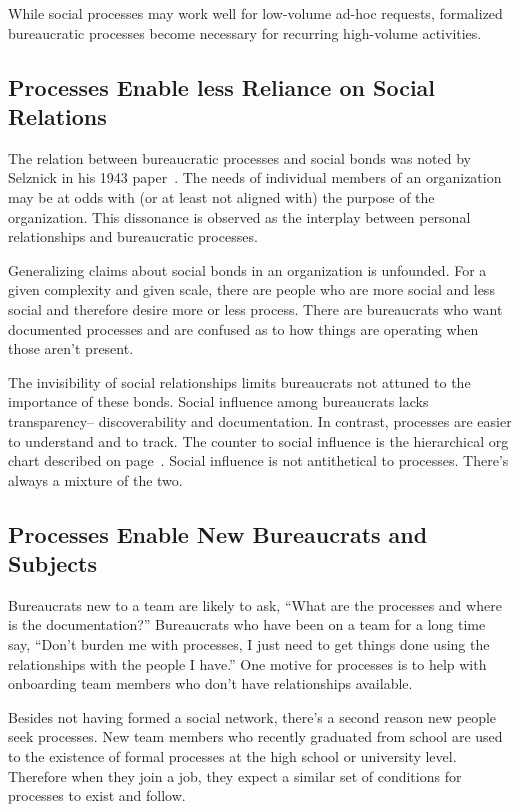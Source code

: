 While social processes may work well for low-volume ad-hoc requests, formalized bureaucratic processes become necessary for recurring high-volume activities.

\subsection*{Processes Enable less Reliance on Social Relations}

The relation between bureaucratic processes and social bonds was noted by Selznick in his 1943 paper~\cite{1943_Selznick}. The needs of individual members of an organization may be at odds with (or at least not aligned with) the purpose of the organization. This dissonance is observed as the interplay between personal relationships and bureaucratic processes.

Generalizing claims about social bonds in an organization is unfounded. 
For a given complexity and given scale, there are people who are more social and less social and therefore desire more or less process.
There are bureaucrats who want documented processes and are confused as to how things are operating when those aren't present. 

The invisibility of social relationships limits bureaucrats not attuned to the importance of these bonds. 
Social influence among bureaucrats lacks transparency-- discoverability and documentation. 
In contrast, processes are easier to understand and to track. The counter to social influence is the hierarchical \gls{org chart} described on 
page~\pageref{sec:org-chart-as-guide-and-lie}.
Social influence is not antithetical to processes. There's always a mixture of the two.


\subsection*{Processes Enable New Bureaucrats and Subjects}

Bureaucrats new to a team are likely to ask, ``What are the processes and where is the documentation?'' Bureaucrats who have been on a team for a long time say, ``Don't burden me with processes, I just need to get things done using the relationships with the people I have.'' One motive for processes is to help with onboarding team members who don't have relationships available.

Besides not having formed a social network, there's a second reason new people seek processes. New team members who recently graduated from school are used to the existence of formal processes at the high school or university level. Therefore when they join a job, they expect a similar set of conditions for processes to exist and follow.

